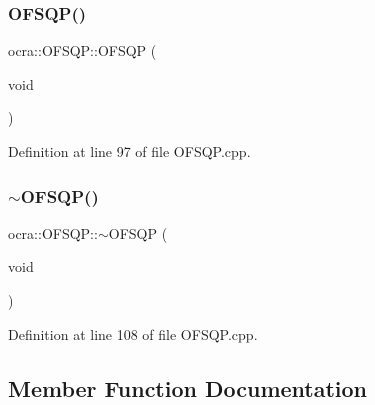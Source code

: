 \subsubsection{\texorpdfstring{O\+F\+S\+Q\+P()}{OFSQP()}}
{\footnotesize\ttfamily ocra\+::\+O\+F\+S\+Q\+P\+::\+O\+F\+S\+QP (\begin{DoxyParamCaption}\item[{void}]{ }\end{DoxyParamCaption})}



Definition at line 97 of file O\+F\+S\+Q\+P.\+cpp.

\hypertarget{classocra_1_1OFSQP_abc15e89ba836e714e10b1589f460e759}{}\label{classocra_1_1OFSQP_abc15e89ba836e714e10b1589f460e759} 
\subsubsection{\texorpdfstring{$\sim$\+O\+F\+S\+Q\+P()}{~OFSQP()}}
{\footnotesize\ttfamily ocra\+::\+O\+F\+S\+Q\+P\+::$\sim$\+O\+F\+S\+QP (\begin{DoxyParamCaption}\item[{void}]{ }\end{DoxyParamCaption})}



Definition at line 108 of file O\+F\+S\+Q\+P.\+cpp.



\subsection{Member Function Documentation}
\hypertarget{classocra_1_1OFSQP_a235aa352025c37af78fc18c28991d18e}{}\label{classocra_1_1OFSQP_a235aa352025c37af78fc18c28991d18e} 
